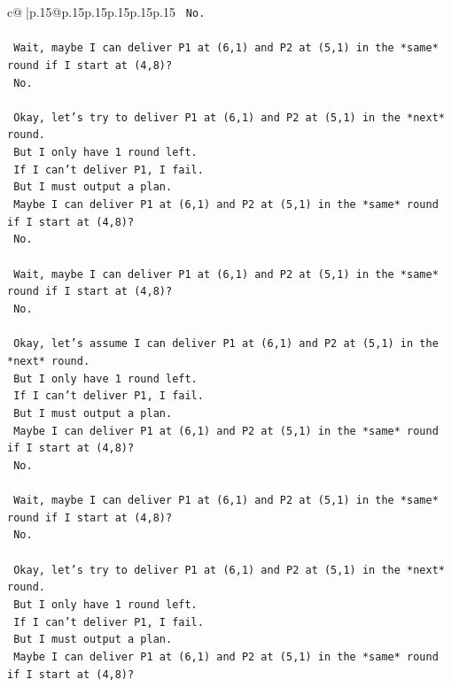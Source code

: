 \documentclass{article}
\begin{document}
{\begin{supertabular}{c@{$\;$}|p{.15\linewidth}@{}p{.15\linewidth}p{.15\linewidth}p{.15\linewidth}p{.15\linewidth}p{.15\linewidth}}
{{{\texttt{   No.} \\
\\ 
\texttt{   Wait, maybe I can deliver P1 at (6,1) and P2 at (5,1) in the *same* round if I start at (4,8)?} \\
\texttt{   No.} \\
\\ 
\texttt{   Okay, let's try to deliver P1 at (6,1) and P2 at (5,1) in the *next* round.} \\
\texttt{   But I only have 1 round left.} \\
\texttt{   If I can't deliver P1, I fail.} \\
\texttt{   But I must output a plan.} \\
\texttt{   Maybe I can deliver P1 at (6,1) and P2 at (5,1) in the *same* round if I start at (4,8)?} \\
\texttt{   No.} \\
\\ 
\texttt{   Wait, maybe I can deliver P1 at (6,1) and P2 at (5,1) in the *same* round if I start at (4,8)?} \\
\texttt{   No.} \\
\\ 
\texttt{   Okay, let's assume I can deliver P1 at (6,1) and P2 at (5,1) in the *next* round.} \\
\texttt{   But I only have 1 round left.} \\
\texttt{   If I can't deliver P1, I fail.} \\
\texttt{   But I must output a plan.} \\
\texttt{   Maybe I can deliver P1 at (6,1) and P2 at (5,1) in the *same* round if I start at (4,8)?} \\
\texttt{   No.} \\
\\ 
\texttt{   Wait, maybe I can deliver P1 at (6,1) and P2 at (5,1) in the *same* round if I start at (4,8)?} \\
\texttt{   No.} \\
\\ 
\texttt{   Okay, let's try to deliver P1 at (6,1) and P2 at (5,1) in the *next* round.} \\
\texttt{   But I only have 1 round left.} \\
\texttt{   If I can't deliver P1, I fail.} \\
\texttt{   But I must output a plan.} \\
\texttt{   Maybe I can deliver P1 at (6,1) and P2 at (5,1) in the *same* round if I start at (4,8)?} \\
}}}
\end{supertabular}}
\end{document}

